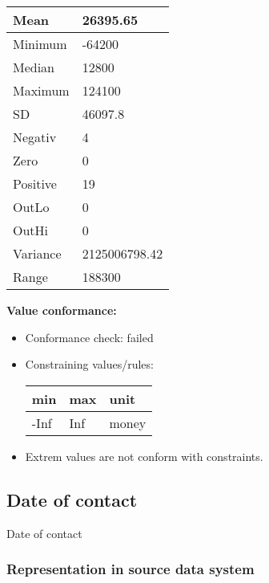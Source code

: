 \documentclass[
]{article}
\providecommand{\tightlist}{%
  \setlength{\itemsep}{0pt}\setlength{\parskip}{0pt}}
\begin{document}
\begin{table}[H]
\centering
\begin{tabular}{l|l}
\hline
Mean & 26395.65\\
\hline
Minimum & -64200\\
\hline
Median & 12800\\
\hline
Maximum & 124100\\
\hline
SD & 46097.8\\
\hline
Negativ & 4\\
\hline
Zero & 0\\
\hline
Positive & 19\\
\hline
OutLo & 0\\
\hline
OutHi & 0\\
\hline
Variance & 2125006798.42\\
\hline
Range & 188300\\
\hline
\end{tabular}
\end{table}

\textbf{Value conformance:}

\begin{itemize}
\tightlist
\item
  Conformance check: failed
\item
  Constraining values/rules:

  \begin{table}[H]
  \centering
  \begin{tabular}{l|l|l}
  \hline
  \textbf{min} & \textbf{max} & \textbf{unit}\\
  \hline
  -Inf & Inf & money\\
  \hline
  \end{tabular}
  \end{table}
\item
  Extrem values are not conform with constraints.
\end{itemize}

\newpage

\hypertarget{date-of-contact}{%
\subsection{Date of contact}\label{date-of-contact}}

Date of contact

\hypertarget{representation-in-source-data-system-5}{%
\subsubsection{\texorpdfstring{Representation in \textbf{source} data
system}{Representation in source data system}}\label{representation-in-source-data-system-5}}
\end{document}
